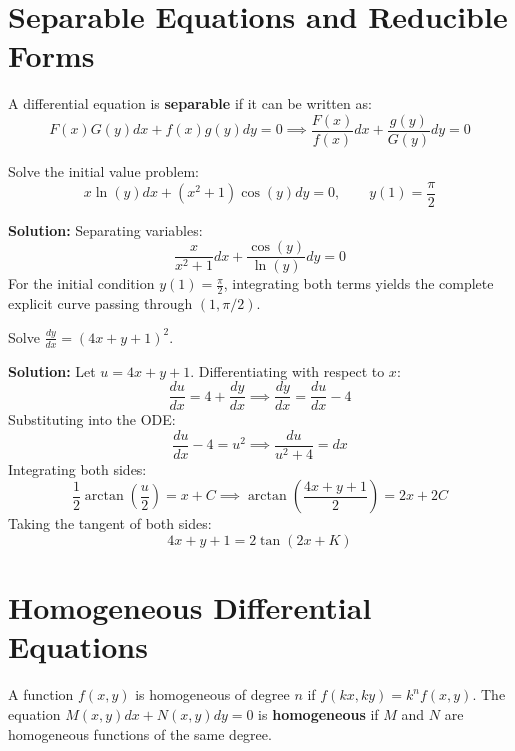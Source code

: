 \documentclass[11pt, a4paper, openany, oneside]{book}
\begin{document}
\section{Separable Equations and Reducible Forms}

\begin{definitionbox}
A differential equation is \textbf{separable} if it can be written as:
\begin{equation}
    F(x)G(y)dx + f(x)g(y)dy = 0 \implies \frac{F(x)}{f(x)}dx + \frac{g(y)}{G(y)}dy = 0
\end{equation}
\end{definitionbox}

\begin{examplebox}
Solve the initial value problem:
\[ x \ln(y) dx + (x^2 + 1) \cos(y) dy = 0, \qquad y(1) = \frac{\pi}{2} \]

\textbf{Solution:}
Separating variables:
\[ \frac{x}{x^2 + 1} dx + \frac{\cos(y)}{\ln(y)} dy = 0 \]
For the initial condition $y(1) = \frac{\pi}{2}$, integrating both terms yields the complete explicit curve passing through $(1, \pi/2)$.
\end{examplebox}

\begin{examplebox}
Solve $\frac{dy}{dx} = (4x + y + 1)^2$.

\textbf{Solution:}
Let $u = 4x + y + 1$. Differentiating with respect to $x$:
\[ \frac{du}{dx} = 4 + \frac{dy}{dx} \implies \frac{dy}{dx} = \frac{du}{dx} - 4 \]
Substituting into the ODE:
\[ \frac{du}{dx} - 4 = u^2 \implies \frac{du}{u^2 + 4} = dx \]
Integrating both sides:
\[ \frac{1}{2} \arctan\left(\frac{u}{2}\right) = x + C \implies \arctan\left(\frac{4x + y + 1}{2}\right) = 2x + 2C \]
Taking the tangent of both sides:
\begin{equation}
    4x + y + 1 = 2 \tan(2x + K)
\end{equation}
\end{examplebox}

\section{Homogeneous Differential Equations}

\begin{definitionbox}
A function $f(x,y)$ is homogeneous of degree $n$ if $f(k x, k y) = k^n f(x,y)$. The equation $M(x,y)dx + N(x,y)dy = 0$ is \textbf{homogeneous} if $M$ and $N$ are homogeneous functions of the same degree.
\end{definitionbox}
\end{document}
